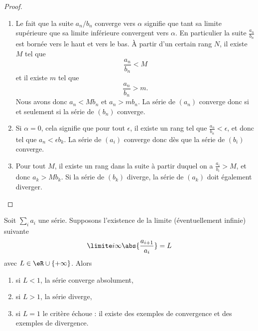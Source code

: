 \begin{proof}
	\begin{enumerate}
		\item
		      Le fait que la suite \( a_n/b_n\) converge vers \( \alpha\) signifie que tant sa limite supérieure que sa limite inférieure convergent vers \( \alpha\). En particulier la suite \( \frac{ a_n }{ b_n }\) est bornée vers le haut et vers le bas. À partir d'un certain rang \( N\), il existe \( M\) tel que
		      \begin{equation}
			      \frac{ a_n }{ b_n }<M
		      \end{equation}
		      et il existe \( m\) tel que
		      \begin{equation}
			      \frac{ a_n }{ b_n }>m.
		      \end{equation}
		      Nous avons donc \( a_n<Mb_n\) et \( a_n>mb_n\). La série de \( (a_n)\) converge donc si et seulement si la série de \( (b_n)\) converge.
		\item
		      Si \( \alpha=0\), cela signifie que pour tout \( \epsilon\), il existe un rang tel que \( \frac{ a_n }{ b_n }<\epsilon\), et donc tel que \( a_n<\epsilon b_k\). La série de \( (a_i)\) converge donc dès que la série de \( (b_i)\) converge.
		\item
		      Pour tout \( M\), il existe un rang dans la suite à partir duquel on a \( \frac{ a_i }{ b_i }>M\), et donc \( a_k>Mb_k\). Si la série de \( (b_k)\) diverge, la série de \( (a_k)\) doit également diverger.
	\end{enumerate}
\end{proof}

\begin{proposition}     \label{PropOXKUooQmAaJX}
	Soit \( \sum_i a_i\) une série. Supposons l'existence de la limite (éventuellement infinie) suivante
	\begin{equation}
		\limite i \infty \abs{\frac{a_{i+1}}{a_i}} = L
	\end{equation}
	avec \( L\in \eR\cup\{ +\infty \}\).  Alors
	\begin{enumerate}
		\item si \(L < 1\), la série converge absolument,
		\item si \(L > 1\), la série diverge,
		\item si \(L = 1\) le critère échoue : il existe des exemples de convergence et des exemples de divergence.
	\end{enumerate}
\end{proposition}

